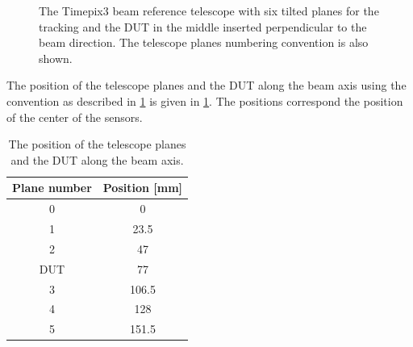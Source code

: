 \begin{figure}[htbp]
  \centering
  \caption{The Timepix3 beam reference telescope with six tilted
    planes for the tracking and the DUT in the middle inserted
    perpendicular to the beam direction. The telescope planes
    numbering convention is also shown.}
  \label{fig:TPX3Telescope}
\end{figure}

The position of the telescope planes and the DUT along the beam axis
using the convention as described in \cref{fig:TPX3Telescope} is given
in \cref{tab:planePos}. The positions correspond the position of the
center of the sensors.

\begin{table}[htbp]
  \centering
  \caption{The position of the telescope planes and the DUT along the
    beam axis.}
  \label{tab:planePos}
  \begin{tabular}{ c c }
    \toprule
    Plane number & Position [mm] \\
    \midrule
    0 & 0 \\
    1 & 23.5 \\
    2 & 47 \\
    DUT & 77 \\
    3 & 106.5 \\
    4 & 128 \\
    5 & 151.5 \\
    \bottomrule
  \end{tabular}
\end{table}

